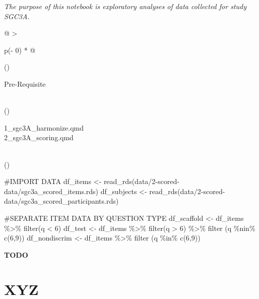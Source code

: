 \documentclass[
  letterpaper,
  DIV=11,
  numbers=noendperiod]{scrreprt}
\newenvironment{Shaded}{\begin{snugshade}}{\end{snugshade}}
\newcommand{\CommentTok}[1]{\textcolor[rgb]{0.37,0.37,0.37}{#1}}
\newcommand{\DecValTok}[1]{\textcolor[rgb]{0.68,0.00,0.00}{#1}}
\newcommand{\FunctionTok}[1]{\textcolor[rgb]{0.28,0.35,0.67}{#1}}
\newcommand{\NormalTok}[1]{\textcolor[rgb]{0.00,0.23,0.31}{#1}}
\newcommand{\OtherTok}[1]{\textcolor[rgb]{0.00,0.23,0.31}{#1}}
\newcommand{\SpecialCharTok}[1]{\textcolor[rgb]{0.37,0.37,0.37}{#1}}
\newcommand{\StringTok}[1]{\textcolor[rgb]{0.13,0.47,0.30}{#1}}
\begin{document}
\emph{The purpose of this notebook is exploratory analyses of data
collected for study SGC3A.}

\begin{longtable}[]{@{}
  >{\raggedright\arraybackslash}p{(\columnwidth - 0\tabcolsep) * }@{}}
\toprule()
\begin{minipage}[b]{\linewidth}\raggedright
Pre-Requisite
\end{minipage} \\
\midrule()
\endhead
\begin{minipage}[t]{\linewidth}\raggedright
1\_sgc3A\_harmonize.qmd\\
2\_sgc3A\_scoring.qmd\strut
\end{minipage} \\
\bottomrule()
\end{longtable}

\begin{Shaded}
\begin{Highlighting}[]
\CommentTok{\#IMPORT DATA }
\NormalTok{df\_items }\OtherTok{\textless{}{-}} \FunctionTok{read\_rds}\NormalTok{(}\StringTok{\textquotesingle{}data/2{-}scored{-}data/sgc3a\_scored\_items.rds\textquotesingle{}}\NormalTok{)}
\NormalTok{df\_subjects }\OtherTok{\textless{}{-}} \FunctionTok{read\_rds}\NormalTok{(}\StringTok{\textquotesingle{}data/2{-}scored{-}data/sgc3a\_scored\_participants.rds\textquotesingle{}}\NormalTok{)}


\CommentTok{\#SEPARATE ITEM DATA BY QUESTION TYPE}
\NormalTok{df\_scaffold }\OtherTok{\textless{}{-}}\NormalTok{ df\_items }\SpecialCharTok{\%\textgreater{}\%} \FunctionTok{filter}\NormalTok{(q }\SpecialCharTok{\textless{}} \DecValTok{6}\NormalTok{)}
\NormalTok{df\_test }\OtherTok{\textless{}{-}}\NormalTok{ df\_items }\SpecialCharTok{\%\textgreater{}\%} \FunctionTok{filter}\NormalTok{(q }\SpecialCharTok{\textgreater{}} \DecValTok{6}\NormalTok{) }\SpecialCharTok{\%\textgreater{}\%} \FunctionTok{filter}\NormalTok{ (q }\SpecialCharTok{\%nin\%} \FunctionTok{c}\NormalTok{(}\DecValTok{6}\NormalTok{,}\DecValTok{9}\NormalTok{))}
\NormalTok{df\_nondiscrim }\OtherTok{\textless{}{-}}\NormalTok{ df\_items }\SpecialCharTok{\%\textgreater{}\%} \FunctionTok{filter}\NormalTok{ (q }\SpecialCharTok{\%in\%} \FunctionTok{c}\NormalTok{(}\DecValTok{6}\NormalTok{,}\DecValTok{9}\NormalTok{))}
\end{Highlighting}
\end{Shaded}

\textbf{TODO}

\hypertarget{xyz}{%
\section{XYZ}\label{xyz}}
\end{document}
